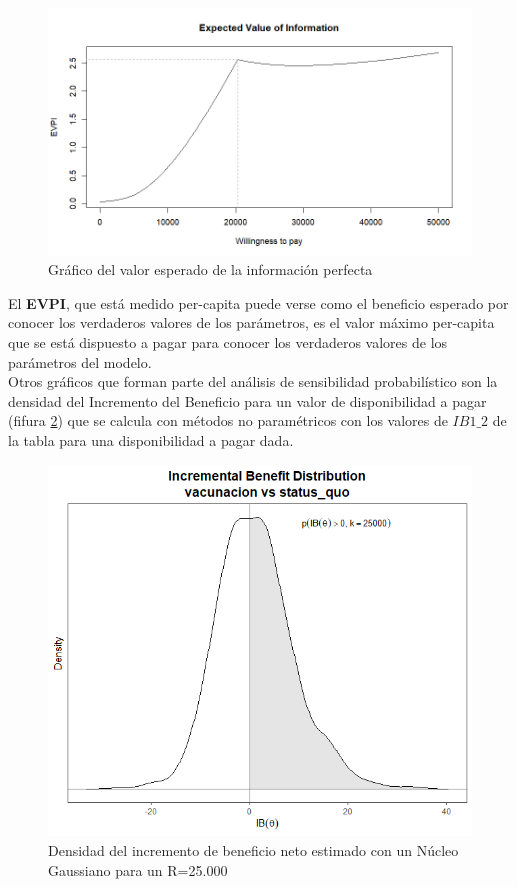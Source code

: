 \documentclass[12pt]{article}
\begin{document}
\begin{figure}[H]
    \centering
    \includegraphics[width=1 \textwidth]{grafi/evi_plot.jpg}
    \caption{Gráfico del valor esperado de la información perfecta}
    \label{fig:65}
\end{figure}

El \textbf{EVPI}, que está medido per-capita puede verse como el beneficio esperado por conocer los verdaderos valores de los parámetros, es el valor máximo per-capita que se está dispuesto a pagar para conocer los verdaderos valores de los parámetros del modelo.\\

Otros gráficos que forman parte del análisis de sensibilidad probabilístico son la densidad del Incremento del Beneficio para un valor de disponibilidad a pagar (fifura \ref{fig:63}) que se calcula con métodos no paramétricos con los valores de $IB1\_2$ de la tabla para una disponibilidad a pagar dada.

\begin{figure}[H]
    \centering
    \includegraphics[width=.65\textwidth]{grafi/ib_plot.jpg}
    \caption{Densidad del incremento de beneficio neto estimado con un Núcleo Gaussiano para un R=25.000}
    \label{fig:63}
\end{figure}
\end{document}
